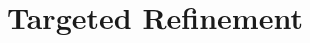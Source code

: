 \documentclass{article}
\begin{document}
% 

%
%   
%     


\section{Targeted Refinement} \label{s:intro}

\end{document}
